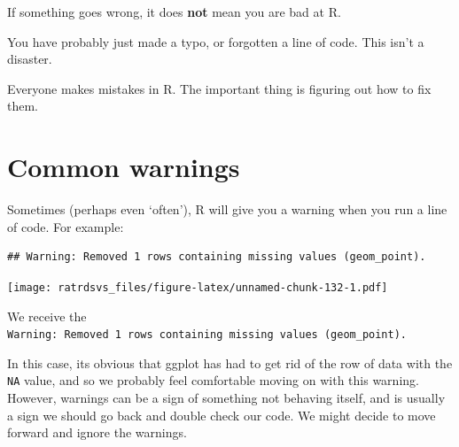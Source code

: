 \documentclass[
]{book}
\newenvironment{Shaded}{\begin{snugshade}}{\end{snugshade}}
\newcommand{\DataTypeTok}[1]{\textcolor[rgb]{0.13,0.29,0.53}{#1}}
\newcommand{\DecValTok}[1]{\textcolor[rgb]{0.00,0.00,0.81}{#1}}
\newcommand{\KeywordTok}[1]{\textcolor[rgb]{0.13,0.29,0.53}{\textbf{#1}}}
\newcommand{\NormalTok}[1]{#1}
\newcommand{\OperatorTok}[1]{\textcolor[rgb]{0.81,0.36,0.00}{\textbf{#1}}}
\newcommand{\OtherTok}[1]{\textcolor[rgb]{0.56,0.35,0.01}{#1}}
\newcommand{\StringTok}[1]{\textcolor[rgb]{0.31,0.60,0.02}{#1}}
\begin{document}
\begin{hey}
If something goes wrong, it does \textbf{not} mean you are bad at R.

You have probably just made a typo, or forgotten a line of code. This
isn't a disaster.

Everyone makes mistakes in R. The important thing is figuring out how to
fix them.
\end{hey}

\hypertarget{trouble_warnings}{%
\section{Common warnings}\label{trouble_warnings}}

Sometimes (perhaps even `often'), R will give you a warning when you run a line of code. For example:

\begin{Shaded}
\end{Shaded}

\begin{verbatim}
## Warning: Removed 1 rows containing missing values (geom_point).
\end{verbatim}

\texttt{[image: ratrdsvs\_files/figure-latex/unnamed-chunk-132-1.pdf]}

We receive the \texttt{Warning:\ Removed\ 1\ rows\ containing\ missing\ values\ (geom\_point).}

In this case, its obvious that ggplot has had to get rid of the row of data with the \texttt{NA} value, and so we probably feel comfortable moving on with this warning. However, warnings can be a sign of something not behaving itself, and is usually a sign we should go back and double check our code. We might decide to move forward and ignore the warnings.
\end{document}
